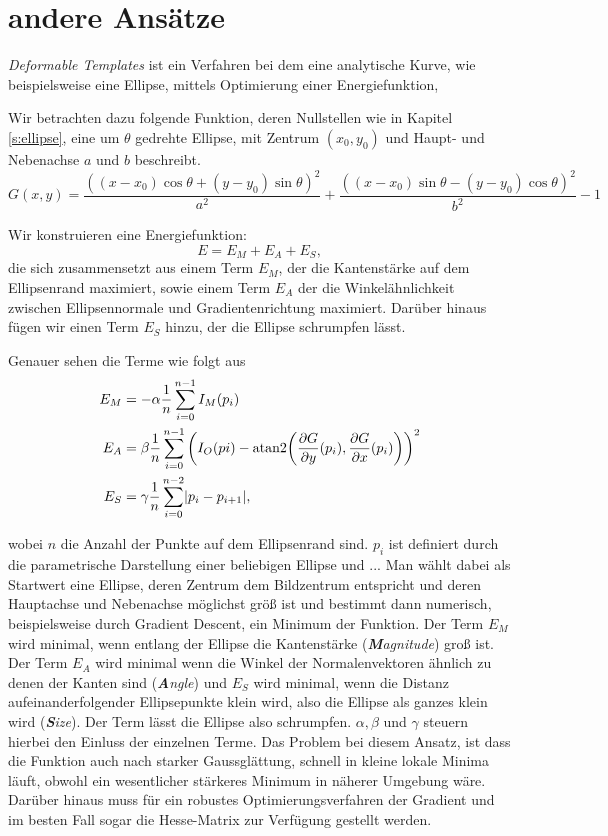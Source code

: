 \section{andere Ansätze}
\textit{Deformable Templates} ist ein Verfahren bei dem eine analytische Kurve, wie beispielsweise eine Ellipse, mittels Optimierung einer Energiefunktion, 


Wir betrachten dazu folgende Funktion, deren Nullstellen wie in Kapitel \ref{s:ellipse}, eine um $\theta$ gedrehte Ellipse, mit Zentrum $(x_0,y_0)$ und Haupt- und Nebenachse $a$ und $b$ beschreibt. 
\begin{equation*}
	G(x,y) = \frac{((x - x_0)\cos\theta + (y - y_0)\sin\theta)^2}{a^2} + \frac{((x - x_0)\sin\theta - (y - y_0)\cos\theta)^2}{b^2} - 1
\end{equation*}

Wir konstruieren eine Energiefunktion:
\begin{equation*}
	E = E_M + E_A + E_S,
\end{equation*}
die sich zusammensetzt aus einem Term $E_M$, der die Kantenstärke auf dem Ellipsenrand maximiert, sowie einem Term $E_A$ der die Winkelähnlichkeit zwischen Ellipsennormale und Gradientenrichtung maximiert. Darüber hinaus fügen wir einen Term $E_S$ hinzu, der die Ellipse schrumpfen lässt. 

Genauer sehen die Terme wie folgt aus
\begin{equation*}
\begin{aligned}
E_M &= -\alpha\frac{1}{n}\sum_{i=0}^{n-1}I_M(p_i) \\
E_A &= \beta\frac{1}{n}\sum_{i=0}^{n-1}\left(I_O(pi) - \text{atan2}{\left(\frac{\partial G}{\partial y}(p_i), \frac{\partial G}{\partial x}(p_i)\right)}\right)^2 \\
E_S &= \gamma\frac{1}{n}\sum_{i=0}^{n-2}\lvert p_i - p_{i+1}\rvert,
\end{aligned}
\end{equation*}

wobei $n$ die Anzahl der Punkte auf dem Ellipsenrand sind. $p_i$ ist definiert durch die parametrische Darstellung einer beliebigen Ellipse und ...
Man wählt dabei als Startwert eine Ellipse, deren Zentrum dem Bildzentrum entspricht und deren Hauptachse und Nebenachse möglichst größ ist und bestimmt dann numerisch, beispielsweise durch Gradient Descent, ein Minimum der Funktion. Der Term $E_M$ wird minimal, wenn entlang der Ellipse die Kantenstärke (\textit{\textbf{M}agnitude}) groß ist. Der Term $E_A$ wird minimal wenn die Winkel der Normalenvektoren ähnlich zu denen der Kanten sind (\textit{\textbf{A}ngle}) und $E_S$ wird minimal, wenn die Distanz aufeinanderfolgender Ellipsepunkte klein wird, also die Ellipse als ganzes klein wird (\textit{\textbf{S}ize}). Der Term lässt die Ellipse also schrumpfen. $\alpha, \beta$ und $\gamma$ steuern hierbei den Einluss der einzelnen Terme. Das Problem bei diesem Ansatz, ist dass die Funktion auch nach starker Gaussglättung, schnell in kleine lokale Minima läuft, obwohl ein wesentlicher stärkeres Minimum in näherer Umgebung wäre. Darüber hinaus muss für ein robustes Optimierungsverfahren der Gradient und im besten Fall sogar die Hesse-Matrix zur Verfügung gestellt werden. 

